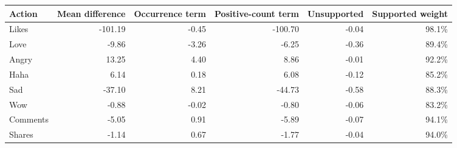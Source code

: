 \begin{tabular}{lrrrrr}
\toprule
Action & Mean difference & Occurrence term & Positive-count term & Unsupported & Supported weight \\
\midrule
Likes & -101.19 & -0.45 & -100.70 & -0.04 & 98.1\% \\
Love & -9.86 & -3.26 & -6.25 & -0.36 & 89.4\% \\
Angry & 13.25 & 4.40 & 8.86 & -0.01 & 92.2\% \\
Haha & 6.14 & 0.18 & 6.08 & -0.12 & 85.2\% \\
Sad & -37.10 & 8.21 & -44.73 & -0.58 & 88.3\% \\
Wow & -0.88 & -0.02 & -0.80 & -0.06 & 83.2\% \\
Comments & -5.05 & 0.91 & -5.89 & -0.07 & 94.1\% \\
Shares & -1.14 & 0.67 & -1.77 & -0.04 & 94.0\% \\
\bottomrule
\end{tabular}
